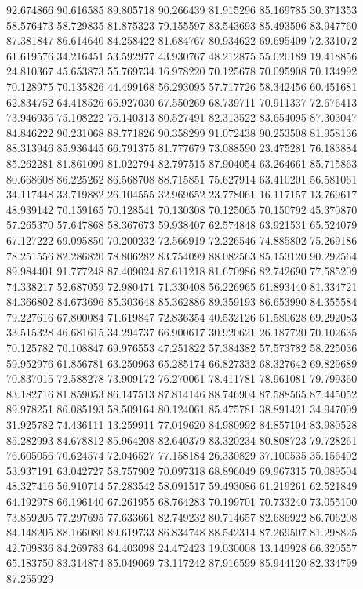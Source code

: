 92.674866
90.616585
89.805718
90.266439
81.915296
85.169785
30.371353
58.576473
58.729835
81.875323
79.155597
83.543693
85.493596
83.947760
87.381847
86.614640
84.258422
81.684767
80.934622
69.695409
72.331072
61.619576
34.216451
53.592977
43.930767
48.212875
55.020189
19.418856
24.810367
45.653873
55.769734
16.978220
70.125678
70.095908
70.134992
70.128975
70.135826
44.499168
56.293095
57.717726
58.342456
60.451681
62.834752
64.418526
65.927030
67.550269
68.739711
70.911337
72.676413
73.946936
75.108222
76.140313
80.527491
82.313522
83.654095
87.303047
84.846222
90.231068
88.771826
90.358299
91.072438
90.253508
81.958136
88.313946
85.936445
66.791375
81.777679
73.088590
23.475281
76.183884
85.262281
81.861099
81.022794
82.797515
87.904054
63.264661
85.715863
80.668608
86.225262
86.568708
88.715851
75.627914
63.410201
56.581061
34.117448
33.719882
26.104555
32.969652
23.778061
16.117157
13.769617
48.939142
70.159165
70.128541
70.130308
70.125065
70.150792
45.370870
57.265370
57.647868
58.367673
59.938407
62.574848
63.921531
65.524079
67.127222
69.095850
70.200232
72.566919
72.226546
74.885802
75.269186
78.251556
82.286820
78.806282
83.754099
88.082563
85.153120
90.292564
89.984401
91.777248
87.409024
87.611218
81.670986
82.742690
77.585209
74.338217
52.687059
72.980471
71.330408
56.226965
61.893440
81.334721
84.366802
84.673696
85.303648
85.362886
89.359193
86.653990
84.355584
79.227616
67.800084
71.619847
72.836354
40.532126
61.580628
69.292083
33.515328
46.681615
34.294737
66.900617
30.920621
26.187720
70.102635
70.125782
70.108847
69.976553
47.251822
57.384382
57.573782
58.225036
59.952976
61.856781
63.250963
65.285174
66.827332
68.327642
69.829689
70.837015
72.588278
73.909172
76.270061
78.411781
78.961081
79.799360
83.182716
81.859053
86.147513
87.814146
88.746904
87.588565
87.445052
89.978251
86.085193
58.509164
80.124061
85.475781
38.891421
34.947009
31.925782
74.436111
13.259911
77.019620
84.980992
84.857104
83.980528
85.282993
84.678812
85.964208
82.640379
83.320234
80.808723
79.728261
76.605056
70.624574
72.046527
77.158184
26.330829
37.100535
35.156402
53.937191
63.042727
58.757902
70.097318
68.896049
69.967315
70.089504
48.327416
56.910714
57.283542
58.091517
59.493086
61.219261
62.521849
64.192978
66.196140
67.261955
68.764283
70.199701
70.733240
73.055100
73.859205
77.297695
77.633661
82.749232
80.714657
82.686922
86.706208
84.148205
88.166080
89.619733
86.834748
88.542314
87.269507
81.298825
42.709836
84.269783
64.403098
24.472423
19.030008
13.149928
66.320557
65.183750
83.314874
85.049069
73.117242
87.916599
85.944120
82.334799
87.255929
